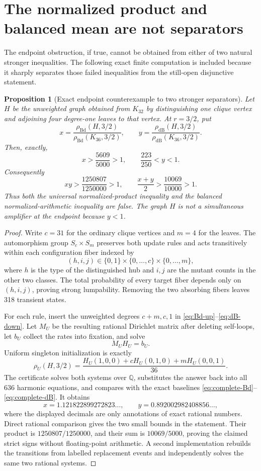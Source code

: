 \documentclass[11pt]{article}
\newtheorem{proposition}[theorem]{Proposition}
\theoremstyle{definition}
\theoremstyle{remark}
\newcommand{\Bd}{\mathrm{Bd}}
\newcommand{\dB}{\mathrm{dB}}
\begin{document}
\section{The normalized product and balanced mean are not separators}
\label{sec:product-counterexample}

The endpoint obstruction, if true, cannot be obtained from either of two
natural stronger inequalities.  The following exact finite computation is
included because it sharply separates those failed inequalities from the
still-open disjunctive statement.

\begin{proposition}[Exact endpoint counterexample to two stronger separators]
\label{prop:product-counterexample}
Let $H$ be the unweighted graph obtained from $K_{32}$ by distinguishing one
clique vertex and adjoining four degree-one leaves to that vertex.  At
$r=3/2$, put
\[
 x=\frac{\rho_{\Bd}(H,3/2)}{\rho_{\Bd}(K_{36},3/2)},\qquad
 y=\frac{\rho_{\dB}(H,3/2)}{\rho_{\dB}(K_{36},3/2)}.
\]
Then, exactly,
\[
 x>\frac{5609}{5000}>1,
 \qquad
 \frac{223}{250}<y<1.
\]
Consequently
\[
 xy>\frac{1250807}{1250000}>1,
 \qquad
 \frac{x+y}{2}>\frac{10069}{10000}>1.
\]
Thus both the universal normalized-product inequality and the balanced
normalized-arithmetic inequality are false.  The graph $H$ is not a
simultaneous amplifier at the endpoint because $y<1$.
\end{proposition}

\begin{proof}
Write $c=31$ for the ordinary clique vertices and $m=4$ for the leaves.  The
automorphism group $S_c\times S_m$ preserves both update rules and acts
transitively within each configuration fiber indexed by
\[
 (h,i,j)\in\{0,1\}\times\{0,\ldots,c\}\times\{0,\ldots,m\},
\]
where $h$ is the type of the distinguished hub and $i,j$ are the mutant
counts in the other two classes.  The total probability of every target
fiber depends only on $(h,i,j)$, proving strong lumpability.  Removing the
two absorbing fibers leaves 318 transient states.

For each rule, insert the unweighted degrees $c+m,c,1$ in
\eqref{eq:Bd-up}--\eqref{eq:dB-down}.  Let $M_U$ be the resulting rational
Dirichlet matrix after deleting self-loops, let $b_U$ collect the rates into
fixation, and solve
\[
 M_UH_U=b_U.
\]
Uniform singleton initialization is exactly
\[
 \rho_U(H,3/2)
 =\frac{H_U(1,0,0)+cH_U(0,1,0)+mH_U(0,0,1)}{36}.
\]
The certificate solves both systems over $\mathbb Q$, substitutes the answer
back into all 636 harmonic equations, and compares with the exact baselines
\eqref{eq:complete-Bd}--\eqref{eq:complete-dB}.  It obtains
\[
 x=1.121822899272823\ldots,
 \qquad y=0.892002982408856\ldots,
\]
where the displayed decimals are only annotations of exact rational
numbers.  Direct rational comparison gives the two small bounds in the
statement.  Their product is $1250807/1250000$, and their sum is
$10069/5000$, proving the claimed strict signs without floating-point
arithmetic.  A second implementation rebuilds the transitions from labelled
replacement events and independently solves the same two rational systems.
\end{proof}
\end{document}
